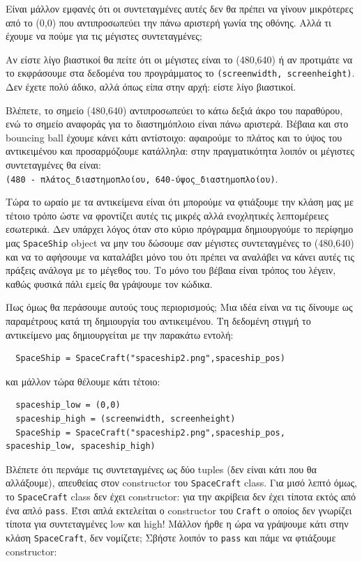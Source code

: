 Είναι μάλλον εμφανές ότι οι συντεταγμένες αυτές δεν θα πρέπει να γίνουν
μικρότερες από το (0,0) που αντιπροσωπεύει την πάνω αριστερή γωνία της οθόνης. Αλλά τι έχουμε να πούμε για τις μέγιστες συντεταγμένες;

Αν είστε λίγο βιαστικοί θα πείτε ότι οι μέγιστες είναι το (480,640) ή αν
προτιμάτε να το εκφράσουμε στα δεδομένα του προγράμματος το
{\tt (screenwidth, screenheight)}. Δεν έχετε πολύ άδικο, αλλά όπως είπα στην αρχή: είστε λίγο βιαστικοί.

Βλέπετε, το σημείο (480,640) αντιπροσωπεύει το κάτω δεξιά άκρο του
παραθύρου, ενώ το σημείο αναφοράς για το διαστημόπλοιο είναι πάνω αριστερά.
Βέβαια και στο bouncing ball έχουμε κάνει κάτι αντίστοιχο: αφαιρούμε το πλάτος
 και το ύψος του αντικειμένου και προσαρμόζουμε κατάλληλα: στην
πραγματικότητα λοιπόν οι μέγιστες συντεταγμένες θα είναι:\\
{\tt (480 - πλάτος\_διαστημοπλοίου, 640-ύψος\_διαστημοπλοίου)}.

Τώρα το ωραίο με τα αντικείμενα είναι ότι μπορούμε να φτιάξουμε την κλάση
μας με τέτοιο τρόπο ώστε να φροντίζει αυτές τις μικρές αλλά ενοχλητικές
λεπτομέρειες εσωτερικά. Δεν υπάρχει λόγος όταν στο κύριο πρόγραμμα δημιουργούμε το περίφημο μας {\tt SpaceShip} object να μην του δώσουμε σαν μέγιστες συντεταγμένες το (480,640) και να το αφήσουμε να καταλάβει μόνο του ότι πρέπει να αναλάβει να κάνει αυτές τις πράξεις ανάλογα με το μέγεθος του. Το μόνο του βέβαια
είναι τρόπος του λέγειν, καθώς φυσικά πάλι εμείς θα γράψουμε τον κώδικα.

Πως όμως θα περάσουμε αυτούς τους περιορισμούς; Μια ιδέα είναι να τις δίνουμε ως παραμέτρους κατά τη δημιουργία του αντικειμένου. Τη δεδομένη στιγμή
το αντικείμενο μας δημιουργείται με την παρακάτω εντολή:

\begin{verbatim}
  SpaceShip = SpaceCraft("spaceship2.png",spaceship_pos)
\end{verbatim}

και μάλλον τώρα θέλουμε κάτι τέτοιο:

\begin{verbatim}
  spaceship_low = (0,0)
  spaceship_high = (screenwidth, screenheight)
  SpaceShip = SpaceCraft("spaceship2.png",spaceship_pos, spaceship_low, spaceship_high)
\end{verbatim}

Βλέπετε ότι περνάμε τις συντεταγμένες ως δύο tuples (δεν είναι κάτι που θα
αλλάξουμε), απευθείας στον constructor του {\tt SpaceCraft} class. Για μισό
λεπτό όμως, το {\tt SpaceCraft} class δεν έχει constructor: για την ακρίβεια δεν έχει
τίποτα εκτός από ένα απλό {\tt pass}. Έτσι απλά εκτελείται ο constructor του {\tt Craft}
ο οποίος δεν γνωρίζει τίποτα για συντεταγμένες low και high! Μάλλον ήρθε η
ώρα να γράψουμε κάτι στην κλάση {\tt SpaceCraft}, δεν νομίζετε; Σβήστε λοιπόν το
{\tt pass} και πάμε να φτιάξουμε constructor:

